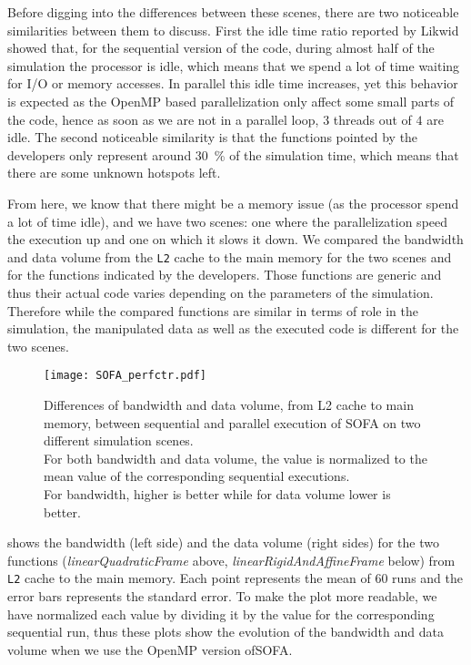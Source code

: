 Before digging into the differences between these scenes, there are two noticeable similarities between them to discuss.
First the idle time ratio reported by \gls{Likwid} showed that, for the sequential version of the code, during almost half of the simulation the processor is idle, which means that we spend a lot of time waiting for \gls{I/O} or memory accesses.
In parallel  this idle time increases, yet this behavior is expected as the \gls{OpenMP} based parallelization only affect some small parts of the code, hence as soon as we are not in a parallel loop, $3$ threads out of $4$ are idle.
The second noticeable similarity is that the functions pointed by the developers only represent around \SI{30}{\%} of the simulation time, which means that there are some unknown hotspots left.

From here, we know that there might be a memory issue (as the processor spend a lot of time idle), and we have two scenes: one where the parallelization speed the execution up and one on which it slows it down.
We compared the bandwidth and data volume from the \texttt{L2} cache to the main memory for the two scenes and for the functions indicated by the developers.
Those functions are generic and thus their actual code varies depending on the parameters of the simulation.
Therefore while the compared functions are similar in terms of role in the simulation, the manipulated data as well as the executed code is different for the two scenes.

\begin{figure}[htb]
    \centering
    \texttt{[image: SOFA\_perfctr.pdf]}
    \caption[SOFA likwid results]{Differences of bandwidth and data volume, from L2 cache to main memory, between sequential and parallel execution of \gls{SOFA} on two different simulation scenes.
        \\
        For both bandwidth and data volume, the value is normalized to the mean value of the corresponding sequential executions.
        \\
        For bandwidth, higher is better while for data volume lower is better.
    }
    \label{fig:SOFA-perfctr}
\end{figure}

 shows the bandwidth (left side) and the data volume (right sides) for the two functions (\emph{linearQuadraticFrame} above, \emph{linearRigidAndAffineFrame} below) from \texttt{L2} cache to the main memory.
Each point represents the mean of $60$ runs and the error bars represents the standard error.
To make the plot more readable, we have normalized each value by dividing it by the value for the corresponding sequential run, thus these plots show the evolution of the bandwidth and data volume when we use the \gls{OpenMP} version of\gls{SOFA}.

